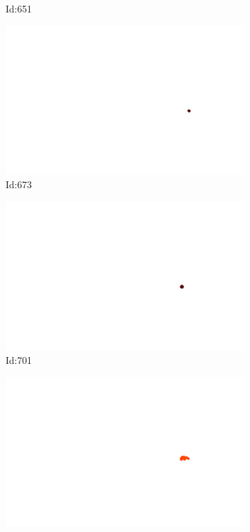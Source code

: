 \documentclass[12pt,twoside]{report}
\begin{document}
\begin{figure}
\begin{subfigure}[b]{0.20\textwidth}
\caption{Id:651}
\end{subfigure}
\begin{subfigure}[b]{0.20\textwidth}
\centering
\includegraphics[width=\textwidth]{../../trajectories/673.png}
\caption{Id:673}
\end{subfigure}
\begin{subfigure}[b]{0.20\textwidth}
\centering
\includegraphics[width=\textwidth]{../../trajectories/701.png}
\caption{Id:701}
\end{subfigure}
\begin{subfigure}[b]{0.20\textwidth}
\centering
\includegraphics[width=\textwidth]{../../trajectories/723.png}

\end{subfigure}
\end{figure}
\end{document}
